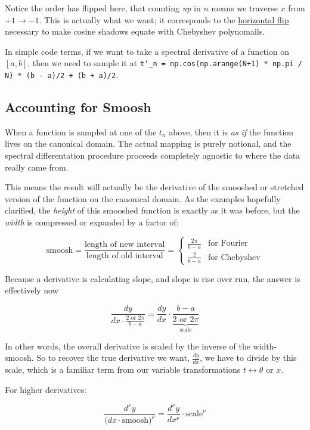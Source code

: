 \documentclass[10pt]{article}
\begin{document}
Notice the order has flipped here, that counting \textit{up} in $n$ means we traverse $x$ from $+1 \rightarrow -1$. This is actually what we want; it corresponds to the \hyperref[cylinder]{horizontal flip} necessary to make cosine shadows equate with Chebyshev polynomails.

In simple code terms, if we want to take a spectral derivative of a function on $[a, b]$, then we need to sample it at \texttt{t\char`_n = np.cos(np.arange(N+1) * np.pi / N) * (b - a)/2 + (b + a)/2}.

\subsection{Accounting for Smoosh}

When a function is sampled at one of the $t_n$ above, then it is \textit{as if} the function lives on the canonical domain. The actual mapping is purely notional, and the spectral differentation procedure proceeds completely agnostic to where the data really came from.

This means the result will actually be the derivative of the smooshed or stretched version of the function on the canonical domain. As the examples hopefully clarified, the \textit{height} of this smooshed function is exactly as it was before, but the \textit{width} is compressed or expanded by a factor of:

$$\text{smoosh} = \frac{\text{length of new interval}}{\text{length of old interval}} = \begin{cases} \frac{2\pi}{b-a} & \text{for Fourier} \\ \frac{2}{b-a} & \text{for Chebyshev} \end{cases}$$

Because a derivative is calculating slope, and slope is rise over run, the answer is effectively now

$$\frac{dy}{dx \cdot \frac{2 \text{ or } 2\pi}{b-a}} = \frac{dy}{dx} \cdot \underbrace{\frac{b-a}{2 \text{ or } 2\pi}}_{\text{scale}}$$

In other words, the overall derivative is scaled by the inverse of the width-smoosh. So to recover the true derivative we want, $\frac{dy}{dx}$, we have to divide by this scale, which is a familiar term from our variable transformations $t \leftrightarrow \theta \text{ or } x$.

For higher derivatives:

$$\frac{d^\nu y}{\big( dx \cdot \text{smoosh})^\nu} = \frac{d^\nu y}{dx^\nu} \cdot \text{scale}^\nu$$
\end{document}
